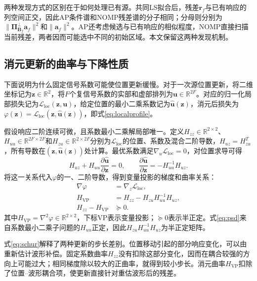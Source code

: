 \documentclass[a4paper,fleqn]{cas-sc}
\numberwithin{equation}{section}
\numberwithin{figure}{section}
\numberwithin{table}{section}
\newcommand{\R}{\mathbb R}
\begin{document}
两种发现方式的区别在于如何处理已有源。共同LS拟合后，残差$\bm r_f$与已有响应的列空间正交，因此AP条件谱和NOMP残差谱的分子相同；分母则分别为$\|\bm\Pi_{\bm B_f}^{\perp}\bm a_f\|^2$和$\|\bm a_f\|^2$。AP还考虑候选与已有响应的相似程度，NOMP直接扫描当前残差，两者因而可能选中不同的初始区域。本文保留这两种发现机制。

\subsection{消元更新的曲率与下降性质}\label{sec:curvature}
下面说明为什么固定信号系数可能使位置更新缓慢。对于一次源位置更新，将二维坐标记为$\bm z\in\R^2$，将$F$个复信号系数的实部和虚部排列为$\bm u\in\R^{2F}$。对应的归一化局部损失记为$\mathcal L_{\mathrm{loc}}(\bm z,\bm u)$，给定位置的最小二乘系数记为$\widehat{\bm u}(\bm z)$，消元后损失为$\varphi(\bm z)=\mathcal L_{\mathrm{loc}}(\bm z,\widehat{\bm u}(\bm z))$，即式\eqref{eq:localprofile}。

假设响应二阶连续可微，且系数最小二乘解局部唯一。定义$H_{zz}\in\R^{2\times2}$、$H_{uu}\in\R^{2F\times2F}$和$H_{zu}\in\R^{2\times2F}$分别为$\mathcal L_{\mathrm{loc}}$的位置、系数及混合二阶导数，$H_{uz}=H_{zu}^T$，所有导数在$(\bm z,\widehat{\bm u}(\bm z))$处计算。最优系数满足$\nabla_u\mathcal L_{\mathrm{loc}}=0$，对位置求导可得
\begin{equation}
 H_{uz}+H_{uu}\frac{\partial\widehat{\bm u}}{\partial\bm z}=0,
 \qquad\frac{\partial\widehat{\bm u}}{\partial\bm z}
 =-H_{uu}^{-1}H_{uz}.\label{eq:coefficientDerivative}
\end{equation}
将这一关系代入$\varphi$的一、二阶导数，得到变量投影的梯度和曲率关系\cite{GolubPereyra1973}：
\begin{align}
 \nabla\varphi&=\nabla_z\mathcal L_{\mathrm{loc}},\label{eq:envelope}\\
 H_{\mathrm{VP}}&=H_{zz}-H_{zu}H_{uu}^{-1}H_{uz},\label{eq:schur}\\
 H_{zz}-H_{\mathrm{VP}}&\succeq0 .\label{eq:psd}
\end{align}
其中$H_{\mathrm{VP}}=\nabla^2\varphi\in\R^{2\times2}$，下标VP表示变量投影；$\succeq0$表示半正定。式\eqref{eq:psd}来自系数最小二乘子问题的$H_{uu}$正定，因此$H_{zu}H_{uu}^{-1}H_{uz}$为半正定矩阵。

式\eqref{eq:schur}解释了两种更新的步长差别。位置移动引起的部分响应变化，可以由重新估计波形补偿。固定系数曲率$H_{zz}$没有扣除这部分变化，因而在耦合较强的方向上可能过大；相同梯度除以较大的正曲率，就得到较小步长。消元曲率$H_{\mathrm{VP}}$扣除了位置--波形耦合项，使更新直接针对重估波形后的残差。
\end{document}
